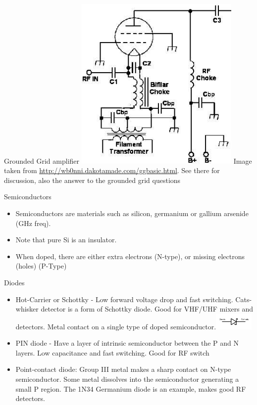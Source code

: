 \documentclass{beamer}
\begin{document}
\begin{frame}{Grounded Grid amplifier}{}
\includegraphics[width=0.6\textwidth]{images/gg1.jpg}
Image taken from \url{http://wb0nni.dakotamade.com/ggbasic.html}.  See there for discussion, also the answer to the grounded grid questions
\end{frame}

\begin{frame}{Semiconductors}{}
\begin{itemize}
\item Semiconductors are materials such as silicon, germanium or gallium arsenide (GHz freq).
\item Note that pure Si is an insulator.  
\item When doped, there are either extra electrons (N-type), or missing electrons (holes) (P-Type)
\end{itemize}
\end{frame}

\begin{frame}{Diodes}{}
\begin{itemize}
\item Hot-Carrier or Schottky - Low forward voltage drop and fast switching.  Cats-whisker detector is a form of Schottky diode.  Good for VHF/UHF mixers and detectors. Metal contact on a single type of doped semiconductor.\includegraphics[width=0.15\textwidth]{images/Schottky_diode.png}

\item PIN diode - Have a layer of intrinsic semiconductor between the P and N layers.  Low capacitance and fast switching. Good for RF switch
\item Point-contact diode: Group III metal makes a sharp contact on N-type semiconductor.  Some metal dissolves into the semiconductor generating a small P region.  The 1N34 Germanium diode is an example, makes good RF detectors.
\end{itemize}
\end{frame}
\end{document}

